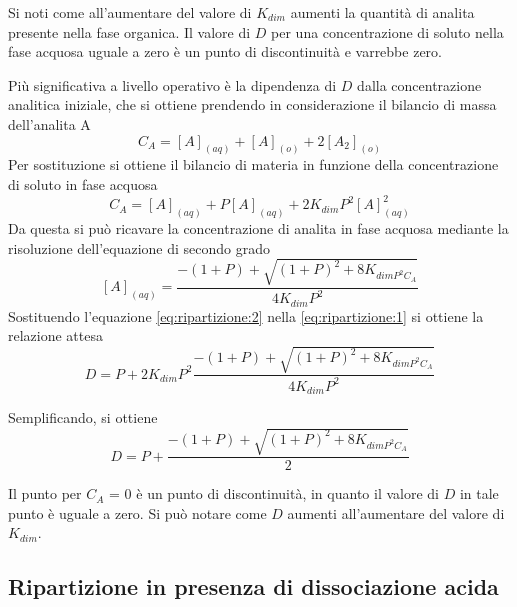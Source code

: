 
Si noti come all'aumentare del valore di $K_{dim}$ aumenti la quantità di analita presente nella fase organica. Il valore di $D$ per una concentrazione di soluto nella fase acquosa uguale a zero è un punto di discontinuità e varrebbe zero.

Più significativa a livello operativo è la dipendenza di $D$ dalla concentrazione analitica iniziale, che si ottiene prendendo in considerazione il bilancio di massa dell'analita A
\[
C_A = [A]_{(aq)} + [A]_{(o)} + 2 [A_2]_{(o)}
\]
Per sostituzione si ottiene il bilancio di materia in funzione della concentrazione di soluto in fase acquosa
\[
C_A = [A]_{(aq)} + P [A]_{(aq)} + 2K_{dim} P^2 [A]_{(aq)}^2
\]
Da questa si può ricavare la concentrazione di analita in fase acquosa mediante la risoluzione dell'equazione di secondo grado
\begin{equation} \label{eq:ripartizione:2}
[A]_{(aq)} = \frac{-(1+P) + \sqrt{(1+P)^2 + 8 K_{dim P^2 C_A}}}{4 K_{dim} P^2}
\end{equation}
Sostituendo l'equazione \ref{eq:ripartizione:2} nella \ref{eq:ripartizione:1} si ottiene la relazione attesa
\[
D = P + 2K_{dim} P^2 \frac{-(1+P) + \sqrt{(1+P)^2 + 8 K_{dim P^2 C_A}}}{4 K_{dim} P^2}
\]

Semplificando, si ottiene
\[
D = P + \frac{-(1+P) + \sqrt{(1+P)^2 + 8 K_{dim P^2 C_A}}}{2}
\]

Il punto per $C_A$ = 0 è un punto di discontinuità, in quanto il valore di $D$ in tale punto è uguale a zero. Si può notare come $D$ aumenti all'aumentare del valore di $K_{dim}$.

\subsection{Ripartizione in presenza di dissociazione acida}


